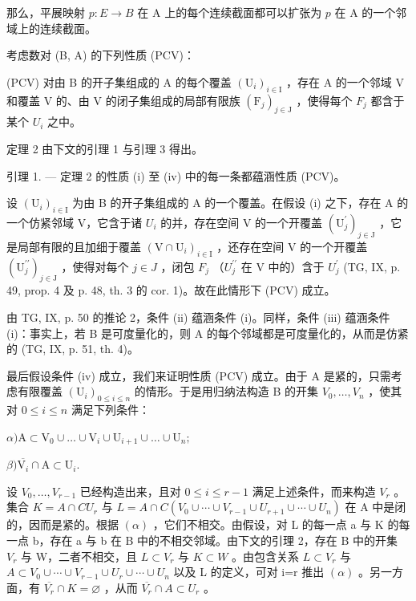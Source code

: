 那么，平展映射 \(p\colon E \to B\) 在 A 上的每个连续截面都可以扩张为 \(p\) 在 A 的一个邻域上的连续截面。

考虑数对 (B, A) 的下列性质 (PCV)：

(PCV) 对由 B 的开子集组成的 A 的每个覆盖 \((\mathrm{U}_{i})_{i\in\mathrm{I}}\) ，存在 A 的一个邻域 V 和覆盖 V 的、由 V 的闭子集组成的局部有限族 \((\mathrm{F}_{j})_{j\in\mathrm{J}}\) ，使得每个 \(F_{j}\) 都含于某个 \(U_{i}\) 之中。

定理 2 由下文的引理 1 与引理 3 得出。

引理 1. --- 定理 2 的性质 (i) 至 (iv) 中的每一条都蕴涵性质 (PCV)。

设 \((\mathrm{U}_{i})_{i\in\mathrm{I}}\) 为由 B 的开子集组成的 A 的一个覆盖。在假设 (i) 之下，存在 A 的一个仿紧邻域 V，它含于诸 \(U_{i}\) 的并，存在空间 V 的一个开覆盖 \((\mathrm{U}_{j}^{\prime})_{j\in\mathrm{J}}\) ，它是局部有限的且加细于覆盖 \((\mathrm{V}\cap\mathrm{U}_{i})_{i\in\mathrm{I}}\) ，还存在空间 V 的一个开覆盖 \((\mathrm{U}_{j}^{\prime\prime})_{j\in\mathrm{J}}\) ，使得对每个 \(j\in J\) ，闭包 \(F_{j}\) （\(U_{j}^{\prime\prime}\) 在 V 中的）含于 \(U_{j}^{\prime}\) (TG, IX, p. 49, prop. 4 及 p. 48, th. 3 的 cor. 1)。故在此情形下 (PCV) 成立。

由 TG, IX, p. 50 的推论 2，条件 (ii) 蕴涵条件 (i)。同样，条件 (iii) 蕴涵条件 (i)：事实上，若 B 是可度量化的，则 A 的每个邻域都是可度量化的，从而是仿紧的 (TG, IX, p. 51, th. 4)。

最后假设条件 (iv) 成立，我们来证明性质 (PCV) 成立。由于 A 是紧的，只需考虑有限覆盖 \((\mathrm{U}_{i})_{0\leqslant i\leqslant n}\) 的情形。于是用归纳法构造 B 的开集 \(V_{0},\ldots,V_{n}\) ，使其对 \(0\leqslant i\leqslant n\) 满足下列条件：

\(\alpha)\mathrm{A}\subset \mathrm{V}_{0}\cup \dots \cup \mathrm{V}_{i}\cup \mathrm{U}_{i + 1}\cup \dots \cup \mathrm{U}_{n};\)

\(\beta)\overline{\mathrm{V}_{i}}\cap \mathrm{A}\subset \mathrm{U}_{i}.\)

设 \(V_{0},\ldots,V_{r-1}\) 已经构造出来，且对 \(0\leqslant i\leqslant r-1\) 满足上述条件，而来构造 \(V_{r}\) 。集合 \(K=A\cap C U_{r}\) 与 \(L=A\cap C(V_{0}\cup\cdots\cup V_{r-1}\cup U_{r+1}\cup\cdots\cup U_{n})\) 在 A 中是闭的，因而是紧的。根据 \((\alpha)\) ，它们不相交。由假设，对 L 的每一点 a 与 K 的每一点 b，存在 a 与 b 在 B 中的不相交邻域。由下文的引理 2，存在 B 中的开集 \(V_{r}\) 与 W，二者不相交，且 \(L\subset V_{r}\) 与 \(K\subset W\) 。由包含关系 \(L\subset V_{r}\) 与 \(A\subset V_{0}\cup\cdots\cup V_{r-1}\cup U_{r}\cup\cdots\cup U_{n}\) 以及 L 的定义，可对 i=r 推出 \((\alpha)\) 。另一方面，有 \(\overline{V_{r}}\cap K=\varnothing\) ，从而 \(\overline{V_{r}}\cap A\subset U_{r}\) 。

